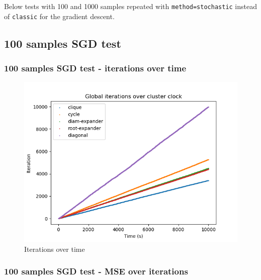 \documentclass[11pt]{article}
\makeatletter
\def\maxwidth{\ifdim\Gin@nat@width>\linewidth\linewidth
    \else\Gin@nat@width\fi}
\let\Oldincludegraphics\includegraphics
\renewcommand{\includegraphics}[1]{\Oldincludegraphics[width=.8\maxwidth]{#1}}
\makeatother
\begin{document}
Below tests with 100 and 1000 samples repeated with
\texttt{method=\textquotesingle{}stochastic\textquotesingle{}} instead
of \texttt{classic} for the gradient descent.

\subsection{100 samples SGD test}\label{samples-sgd-test}

\subsubsection{100 samples SGD test - iterations over
time}\label{samples-sgd-test---iterations-over-time}

\begin{figure}
\centering
\includegraphics{media/img/tests/test_003_100samples_stochastic/1_iter_time.png}
\caption{Iterations over time}
\end{figure}

\subsubsection{100 samples SGD test - MSE over
iterations}\label{samples-sgd-test---mse-over-iterations}
\end{document}
